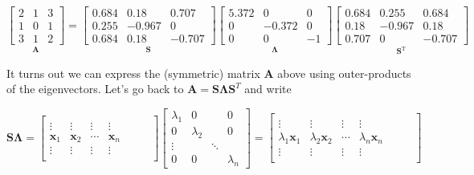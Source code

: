 \documentclass[main.tex]{subfiles}
\begin{document}
$$
\underset{\mathbf{A}}{\left[\begin{array}{lll}
2 & 1 & 3 \\
1 & 0 & 1 \\
3 & 1 & 2
\end{array}\right]}
=
\underset{\mathbf{S}}{\left[\begin{array}{ccc}
0.684 & 0.18 & 0.707 \\
0.255 & -0.967 & 0 \\
0.684 & 0.18 & -0.707
\end{array}\right]}
\underset{\mathbf{\Lambda}}{\left[\begin{array}{ccc}
5.372 & 0 & 0 \\
0 & -0.372 & 0 \\
0 & 0 & -1
\end{array}\right]}
\underset{\mathbf{S}^{\mathrm{T}}}{\left[\begin{array}{ccc}
0.684 & 0.255 & 0.684 \\
0.18 & -0.967 & 0.18 \\
0.707 & 0 & -0.707
\end{array}\right]}
$$

It turns out we can express the (symmetric) matrix $\mathbf{A}$ above using outer-products of the eigenvectors. Let's go back to $\mathbf{A}=\mathbf{S} \mathbf{\Lambda} \mathbf{S}^{T}$ and write

$$
\mathbf{S} \mathbf{\Lambda}=\left[\begin{array}{cccc} 
& & & \\
\vdots & \vdots & \vdots & \vdots \\
\mathbf{x}_{1} & \mathbf{x}_{2} & \cdots & \mathbf{x}_{n} \\
\vdots & \vdots & \vdots & \vdots
& & & \\
\end{array}\right]
\left[\begin{array}{cccc}
\lambda_{1} & 0 & & 0 \\
0 & \lambda_{2} & & 0 \\
\vdots & & \ddots & \\
0 & 0 & & \lambda_{n}
\end{array}\right]
=
\left[\begin{array}{cccc} 
& & & \\
\vdots & \vdots & \vdots & \vdots \\
\lambda_{1} \mathbf{x}_{1} & \lambda_{2} \mathbf{x}_{2} & \cdots & \lambda_{n} \mathbf{x}_{n} \\
\vdots & \vdots & \vdots & \vdots
& & & \\
\end{array}\right]
$$
\end{document}
